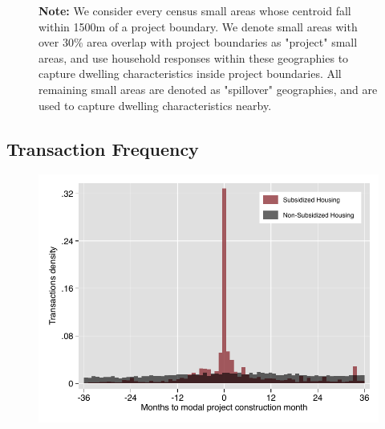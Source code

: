 \documentclass[12pt]{article}
\begin{document}
\begin{figure}[h!]
\centering
{}
\vspace{2mm}
\caption*{\footnotesize {\bf Note:} We consider every census small areas whose centroid fall within 1500m of a project boundary. We denote small areas with over 30\% area overlap with project boundaries as "project" small areas, and use household responses within these geographies to capture dwelling characteristics inside project boundaries. All remaining small areas are denoted as "spillover" geographies, and are used to capture dwelling characteristics nearby.}
\end{figure}

\pagebreak
\subsection{Transaction Frequency}
\label{appendix:histfreq}
\vspace{-5mm}
\begin{figure}[h!]
\centering
\includegraphics[scale=1.2,trim={.2cm 0.2cm .2cm 0.2cm},clip]{figures/transactions_histogram.pdf}
\end{figure}
\end{document}
